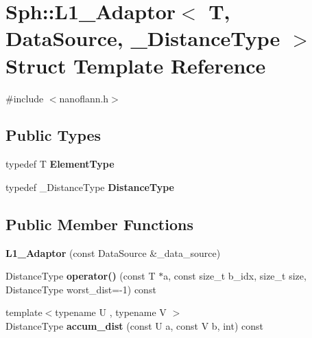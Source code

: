 \hypertarget{structSph_1_1L1__Adaptor}{}\section{Sph\+:\+:L1\+\_\+\+Adaptor$<$ T, Data\+Source, \+\_\+\+Distance\+Type $>$ Struct Template Reference}
\label{structSph_1_1L1__Adaptor}


{\ttfamily \#include $<$nanoflann.\+h$>$}

\subsection*{Public Types}
\begin{DoxyCompactItemize}
\item 
\hypertarget{structSph_1_1L1__Adaptor_a6deb0201338f2110e1eae879a884edbb}{}\label{structSph_1_1L1__Adaptor_a6deb0201338f2110e1eae879a884edbb} 
typedef T {\bfseries Element\+Type}
\item 
\hypertarget{structSph_1_1L1__Adaptor_a3c106e0998983a06a7b2789cb5d8d479}{}\label{structSph_1_1L1__Adaptor_a3c106e0998983a06a7b2789cb5d8d479} 
typedef \+\_\+\+Distance\+Type {\bfseries Distance\+Type}
\end{DoxyCompactItemize}
\subsection*{Public Member Functions}
\begin{DoxyCompactItemize}
\item 
\hypertarget{structSph_1_1L1__Adaptor_a69ec3a85eadd3533e8d2c0e614852f73}{}\label{structSph_1_1L1__Adaptor_a69ec3a85eadd3533e8d2c0e614852f73} 
{\bfseries L1\+\_\+\+Adaptor} (const Data\+Source \&\+\_\+data\+\_\+source)
\item 
\hypertarget{structSph_1_1L1__Adaptor_a76be53fb089b9aa63d523de66dae2f29}{}\label{structSph_1_1L1__Adaptor_a76be53fb089b9aa63d523de66dae2f29} 
Distance\+Type {\bfseries operator()} (const T $\ast$a, const size\+\_\+t b\+\_\+idx, size\+\_\+t size, Distance\+Type worst\+\_\+dist=-\/1) const
\item 
\hypertarget{structSph_1_1L1__Adaptor_ad1f49f13b3756278720413e0cd6a0833}{}\label{structSph_1_1L1__Adaptor_ad1f49f13b3756278720413e0cd6a0833} 
{\footnotesize template$<$typename U , typename V $>$ }\\Distance\+Type {\bfseries accum\+\_\+dist} (const U a, const V b, int) const
\end{DoxyCompactItemize}
